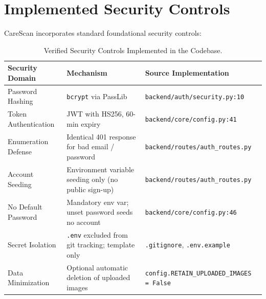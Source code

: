 \documentclass[11pt,a4paper]{report}
\newcommand{\artifact}[1]{\texttt{\footnotesize #1}}
\begin{document}
\section{Implemented Security Controls}
CareScan incorporates standard foundational security controls:
\begin{table}[H]
\centering
\small
\begin{tabularx}{\textwidth}{llX}
\toprule
\textbf{Security Domain} & \textbf{Mechanism} & \textbf{Source Implementation} \\
\midrule
Password Hashing & \texttt{bcrypt} via PassLib & \artifact{backend/auth/security.py:10} \\
Token Authentication & JWT with HS256, 60-min expiry & \artifact{backend/core/config.py:41} \\
Enumeration Defense & Identical 401 response for bad email / password & \artifact{backend/routes/auth\_routes.py} \\
Account Seeding & Environment variable seeding only (no public sign-up) & \artifact{backend/routes/auth\_routes.py} \\
No Default Password & Mandatory env var; unset password seeds no account & \artifact{backend/core/config.py:46} \\
Secret Isolation & \texttt{.env} excluded from git tracking; template only & \artifact{.gitignore}, \artifact{.env.example} \\
Data Minimization & Optional automatic deletion of uploaded images & \artifact{config.RETAIN\_UPLOADED\_IMAGES = False} \\
\bottomrule
\end{tabularx}
\caption{Verified Security Controls Implemented in the Codebase.}
\label{tab:security_controls}
\end{table}
\end{document}
